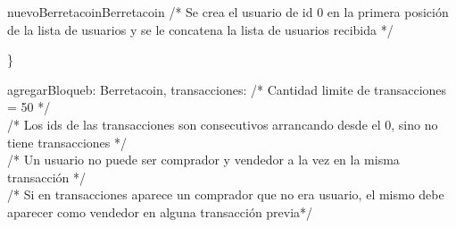 \documentclass[10pt,a4paper]{article}
\begin{document}
\begin{tcolorbox}
        \begin{proc}{nuevoBerretacoin}{}{Berretacoin}
            \textcolor{babyblue}{/* Se crea el usuario de id 0 en la primera posición de la lista de usuarios y se le concatena la lista de usuarios recibida */} \\
        \end{proc} \}
        \vspace{0.3em}
        \begin{proc}{agregarBloque}{\Inout b: Berretacoin, \In transacciones: }{}
            \textcolor{babyblue}{/* Cantidad limite de transacciones = 50 */} \\
            \textcolor{babyblue}{/* Los ids de las transacciones son consecutivos arrancando desde el 0, sino no tiene transacciones */} \\
            \textcolor{babyblue}{/* Un usuario no puede ser comprador y vendedor a la vez en la misma transacción */} \\
            \textcolor{babyblue}{/* Si en transacciones aparece un comprador que no era usuario, el mismo debe aparecer como vendedor en alguna transacción previa*/} \\
\end{proc}
\end{tcolorbox}
\end{document}
